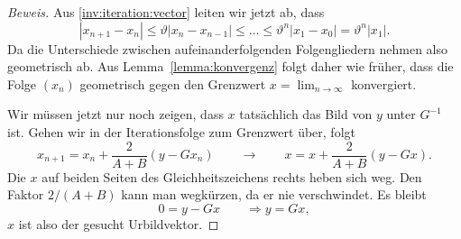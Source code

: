 \begin{proof}[Beweis]
Aus \eqref{inv:iteration:vector} leiten wir jetzt ab, dass
\[
|x_{n+1} - x_n|
\le \vartheta |x_n-x_{n-1}|
\le \dots \le \vartheta^n |x_1-x_0|=\vartheta^n |x_1|.
\]
Da die Unterschiede zwischen aufeinanderfolgenden Folgengliedern
nehmen also geometrisch ab.
Aus Lemma~\ref{lemma:konvergenz} folgt daher wie früher, dass
die Folge $(x_n)$ geometrisch gegen den Grenzwert $x=\lim_{n\to\infty}$
konvergiert.

Wir müssen jetzt nur noch zeigen, dass $x$ tatsächlich das Bild von $y$
unter $G^{-1}$ ist.
Gehen wir in der Iterationsfolge zum Grenzwert über, folgt
\[
x_{n+1} = x_n + \frac{2}{A+B}(y-Gx_n)
\qquad\rightarrow\qquad
x = x + \frac{2}{A+B}(y-Gx).
\]
Die $x$ auf beiden Seiten des Gleichheitszeichens rechts
heben sich weg.
Den Faktor $2/(A+B)$ kann man wegkürzen, da er nie verschwindet.
Es bleibt
\[
0
=
y-Gx
\qquad
\Rightarrow
y=Gx,
\]
$x$ ist also der gesucht Urbildvektor.
\end{proof}

